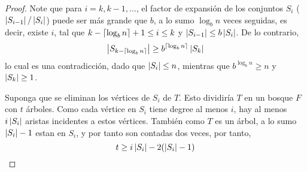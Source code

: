 \documentclass[../np-approximations.tex]{subfiles}
\begin{document}
\begin{proof}
	Note que para $i=k,k-1,\dots$, el factor de expansión de los 
	conjuntos $S_i$ ($\left \vert S_{i-1} \right \vert/\left \vert S_i \right \vert$) puede ser más 
	grande que $b$, a lo sumo $\log_b n$ veces seguidas, es decir, 
	existe $i$, tal que $k-\left \lceil \log_b n \right \rceil + 1 \le i \le k$ y
	$\left \vert S_{i-1} \right \vert \le b \left \vert S_i \right \vert$. De lo contrario,
	\begin{equation}
		\label{eq:ratio}
		\left \vert S_{k-\left \lceil \log_b n \right \rceil} \right \vert \ge
		b^{\left \lceil \log_b n \right \rceil} \left \vert S_k \right \vert
	\end{equation}
	lo cual es una contradicción, dado que $\left \vert S_i \right \vert \le n$, 
	mientras que $b^{\log_b n} \ge n$ y $\left \vert S_k \right \vert \ge 1$.
																                                    
	Suponga que se eliminan los vértices de $S_i$ de $T$. Esto 
	dividiría $T$ en un bosque $F$ con $t$ árboles. Como cada 
	vértice en $S_i$ tiene degree al menos $i$, hay al menos
	$i\left \vert S_i \right \vert$ aristas incidentes a estos vértices. También como 
	$T$ es un árbol, a lo sumo $\left \vert S_i \right \vert - 1$ estan en $S_i$, y 
	por tanto son contadas dos veces, por tanto,
	\begin{equation}
		\label{eq:t.lb}
		t \ge i\left \vert S_i \right \vert - 2(\left \vert S_i \right \vert - 1)
	\end{equation}
																                                    

\end{proof}
\end{document}
